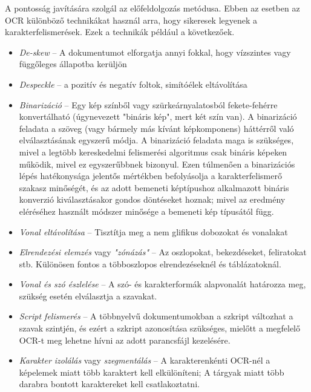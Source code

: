 
A pontosság javítására szolgál az előfeldolgozás metódusa. Ebben az esetben az OCR különböző technikákat használ arra, hogy sikeresek legyenek a karakterfelismerések. Ezek a technikák például a következőek.
\begin{itemize}
	\item \textit{De-skew} -- A dokumentumot elforgatja annyi fokkal, hogy vízszintes vagy függőleges állapotba kerüljön
	
	\item \textit{Despeckle} -- a pozitív és negatív foltok, simítóélek eltávolítása
	
	\item \textit{Binarizáció} -- Egy kép színből vagy szürkeárnyalatosból fekete-fehérre konvertálható (úgynevezett "bináris kép", mert két szín van). A binarizáció feladata a szöveg (vagy bármely
	más kívánt képkomponens) háttérről való elválasztásának egyszerű módja. A binarizáció feladata maga is szükséges, mivel a legtöbb kereskedelmi felismerési algoritmus csak bináris képeken működik, mivel ez egyszerűbbnek bizonyul. Ezen túlmenően a binarizációs lépés hatékonysága jelentős mértékben befolyásolja a karakterfelismerő szakasz minőségét, és az adott bemeneti képtípushoz alkalmazott bináris konverzió kiválasztásakor gondos döntéseket hoznak; mivel az eredmény eléréséhez használt módszer minősége a bemeneti kép típusától függ.
	
	\item \textit{Vonal eltávolítása} -- Tisztítja meg a nem glifikus dobozokat és vonalakat
	
	\item \textit{Elrendezési elemzés} vagy \textit{"zónázás"} -- Az oszlopokat, bekezdéseket, feliratokat stb. Különösen fontos a többoszlopos elrendezéseknél és táblázatoknál.
	
	\item \textit{Vonal és szó észlelése} -- A szó- és karakterformák alapvonalát határozza meg, szükség esetén elválasztja a szavakat.
	
	\item \textit{Script felismerés} -- A többnyelvű dokumentumokban a szkript változhat a szavak szintjén, és ezért a szkript azonosítása szükséges, mielőtt a megfelelő OCR-t meg lehetne hívni az
	adott parancsfájl kezelésére.
	
	\item \textit{Karakter izolálás} vagy \textit{szegmentálás} -- A karakterenkénti OCR-nél a képelemek miatt több karaktert kell elkülöníteni; A tárgyak miatt több darabra bontott karaktereket kell
	csatlakoztatni.
	

\end{itemize}
